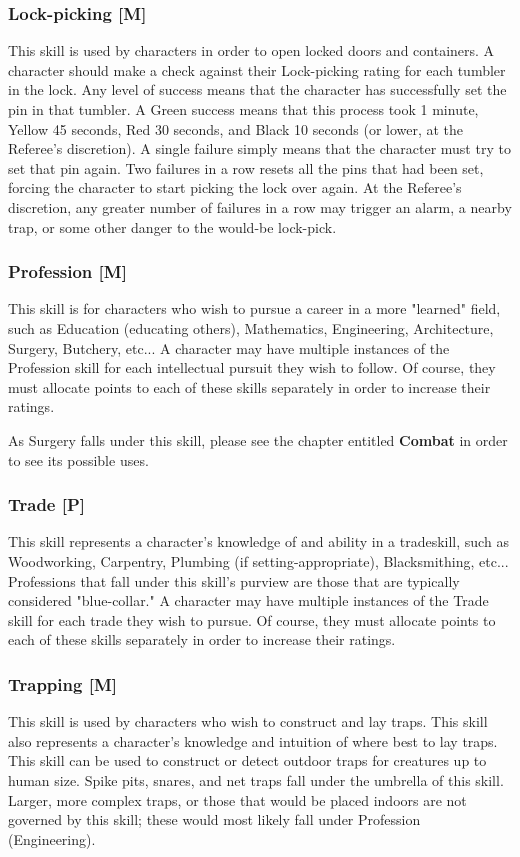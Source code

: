 \documentclass[oneside]{book}
\begin{document}
\begin{multicols}{2}
\subsubsection{Lock-picking [M]}
This skill is used by characters in order to open locked doors and containers. A character should make a check against their Lock-picking rating for each tumbler in the lock. Any level of success means that the character has successfully set the pin in that tumbler. A Green success means that this process took 1 minute, Yellow 45 seconds, Red 30 seconds, and Black 10 seconds (or lower, at the Referee's discretion). A single failure simply means that the character must try to set that pin again. Two failures in a row resets all the pins that had been set, forcing the character to start picking the lock over again. At the Referee's discretion, any greater number of failures in a row may trigger an alarm, a nearby trap, or some other danger to the would-be lock-pick.

\subsubsection{Profession [M]}
This skill is for characters who wish to pursue a career in a more "learned" field, such as Education (educating others), Mathematics, Engineering, Architecture, Surgery, Butchery, etc... A character may have multiple instances of the Profession skill for each intellectual pursuit they wish to follow. Of course, they must allocate points to each of these skills separately in order to increase their ratings. 

As Surgery falls under this skill, please see the chapter entitled \textbf{Combat} in order to see its possible uses. 


\subsubsection{Trade [P]}
This skill represents a character's knowledge of and ability in a tradeskill, such as Woodworking, Carpentry, Plumbing (if setting-appropriate), Blacksmithing, etc... Professions that fall under this skill's purview are those that are typically considered "blue-collar."  A character may have multiple instances of the Trade skill for each trade they wish to pursue. Of course, they must allocate points to each of these skills separately in order to increase their ratings. 

\subsubsection{Trapping [M]}
This skill is used by characters who wish to construct and lay traps. This skill also represents a character's knowledge and intuition of where best to lay traps. This skill can be used to construct or detect outdoor traps for creatures up to human size. Spike pits, snares, and net traps fall under the umbrella of this skill. Larger, more complex traps, or those that would be placed indoors are not governed by this skill; these would most likely fall under Profession (Engineering).


\end{multicols}
\end{document}
